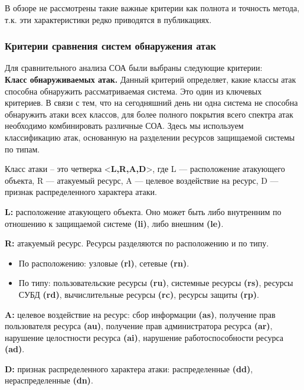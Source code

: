 В обзоре не рассмотрены такие важные критерии как полнота и точность метода, т.к. эти характеристики редко приводятся в публикациях.

\subsubsection{Критерии сравнения систем обнаружения атак}

Для сравнительного анализа СОА были выбраны следующие критерии:\\
\textbf{Класс обнаруживаемых атак.} Данный критерий определяет, какие классы атак способна обнаружить рассматриваемая система. Это один из ключевых критериев. В связи с тем, что на сегодняшний день ни одна система не способна обнаружить атаки всех классов, для более полного покрытия всего спектра атак необходимо комбинировать различные СОА. Здесь мы используем классификацию атак, основанную на разделении ресурсов защищаемой системы по типам.

Класс атаки – это четверка <\textbf{L,R,A,D}>, где L --- расположение атакующего объекта, R --- атакуемый ресурс, A --- целевое воздействие на ресурс, D --- признак распределенного характера атаки.

\textbf{L:} расположение атакующего объекта. Оно может быть либо внутренним по отношению к защищаемой системе \textbf{(li)}, либо внешним \textbf{(le)}.

\textbf{R:} атакуемый ресурс. Ресурсы разделяются по расположению и по типу.

\begin{itemize}

\item По расположению: узловые \textbf{(rl)}, сетевые \textbf{(rn)}.

\item По типу: пользовательские ресурсы \textbf{(ru)}, системные ресурсы \textbf{(rs)}, ресурсы СУБД \textbf{(rd)}, вычислительные ресурсы \textbf{(rc)}, ресурсы защиты \textbf{(rp)}.

\end{itemize}

\textbf{A:} целевое воздействие на ресурс: сбор информации \textbf{(as)}, получение прав пользователя ресурса \textbf{(au)}, получение прав администратора ресурса \textbf{(ar)}, нарушение целостности ресурса \textbf{(ai)}, нарушение работоспособности ресурса \textbf{(ad)}.

\textbf{D:} признак распределенного характера атаки: распределенные \textbf{(dd)}, нераспределенные \textbf{(dn)}.

